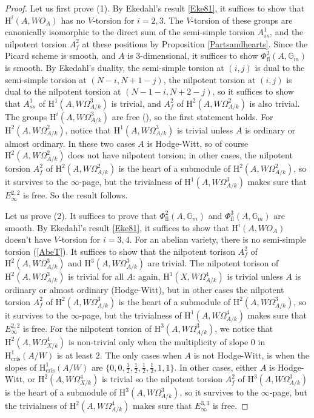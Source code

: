 \documentclass[a4paper,12pt,twoside]{report}
\newcommand{\G}{\mathbb{G}}
\newcommand{\cris}{\mathrm{cris}}
\newcommand{\HH}{\mathrm{H}}
\newcommand{\fl}{\mathrm{fl}}
\begin{document}
\begin{proof}
    Let us first prove (1). By Ekedahl's result \ref{Eke81}, 
it suffices to show that $\HH^i(A,WO_A)$ has no $V$-torsion for $i=2,3$. 
The $V$-torsion of these groups are canonically isomorphic to the direct sum of the semi-simple torsion $A_{ss}^1$, 
and the nilpotent torsion $A_{f}^2$ at these 
positions by Proposition \ref{Partsandhearts}. Since the Picard scheme is smooth, and $A$ is $3$-dimensional, 
it suffices to show $\Phi^2_{\fl}(A,\G_m)$ is smooth. By Ekedahl's duality, the semi-simple torsion at $(i,j)$ is dual to the semi-simple torsion at 
$(N-i,N+1-j)$, the nilpotent torsion at $(i,j)$ is dual to the nilpotent torsion at $(N-1-i,N+2-j)$, 
so it suffices to show that $A_{ss}^1$ of $\HH^1(A,W\Omega^3_{A/k})$ is trivial, and 
$A_{f}^2$ of $\HH^2(A,W\Omega^2_{A/k})$ is also trivial. 
The groups $\HH^i(A,W\Omega^3_{A/k})$ are free (\cite[Proposition II.3.12]{Il1}), so the first statement holds. 
For $\HH^2(A,W\Omega^2_{A/k})$, notice that $\HH^1(A,W\Omega^3_{A/k})$ 
is trivial unless $A$ is ordinary or almost ordinary. 
In these two cases $A$ is Hodge-Witt, so of course $\HH^2(A,W\Omega^2_{A/k})$ does not have nilpotent torsion; 
in other cases, the nilpotent torsion $A_{f}^2$ of $\HH^2(A,W\Omega^2_{A/k})$ 
is the heart of a submodule of $\HH^2(A,W\Omega^2_{A/k})$, so it survives to the $\infty$-page, 
but the trivialness of $\HH^1(A,W\Omega^3_{A/k})$ makes sure that $E_\infty^{2,2}$ is free. So the result follows. 

Let us prove (2). It suffices to prove that $\Phi_{\fl}^2(A,\G_m)$ and $\Phi_{\fl}^3(A,\G_m)$ are smooth. 
By Ekedahl's result \ref{Eke81}, 
it suffices to show that $\HH^i(A,WO_A)$ doesn't have $V$-torsion for $i=3,4$.
For an abelian variety, there is no semi-simple torsion (\ref{AbeT}). 
It suffices to show that the nilpotent torison $A_f^2$ of 
$\HH^2(A,W\Omega_{A/k}^3)$ and $\HH^3(A,W\Omega_{A/k}^3)$ are trivial. 
The nilpotent torison of $\HH^2(A,W\Omega_{A/k}^3)$ is trivial for all $A$: 
again, $\HH^1(X,W\Omega^4_{A/k})$ is trivial unless $A$ is ordinary or almost ordinary (Hodge-Witt), 
but in other cases the nilpotent torsion $A_{f}^2$ of $\HH^2(A,W\Omega^3_{A/k})$ 
is the heart of a submodule of $\HH^2(A,W\Omega^3_{A/k})$, so it survives to the $\infty$-page, 
but the trivialness of $\HH^1(A,W\Omega^4_{A/k})$ makes sure that $E_\infty^{2,2}$ is free. 
For the nilpotent torsion of $\HH^3(A,W\Omega_{A/k}^3)$, 
we notice that $\HH^2(A,W\Omega^4_{X/k})$ is non-trivial 
only when the multiplicity of slope $0$ in $\HH^1_{\cris}(A/W)$ is at least $2$. 
The only cases when $A$ is not Hodge-Witt, is when the slopes of 
$\HH^1_{\cris}(A/W)$ are $\{0,0,\frac{1}{2},\frac{1}{2},\frac{1}{2},\frac{1}{2},1,1\}$. 
In other cases, either $A$ is Hodge-Witt, or  $\HH^2(A,W\Omega^4_{X/k})$ is trivial so 
the nilpotent torsion $A_{f}^2$ of $\HH^3(A,W\Omega^3_{A/k})$ 
is the heart of a submodule of $\HH^3(A,W\Omega^3_{A/k})$, so it survives to the $\infty$-page, 
but the trivialness of $\HH^2(A,W\Omega^4_{A/k})$ makes sure that $E_\infty^{3,3}$ is free.


\end{proof}
\end{document}
